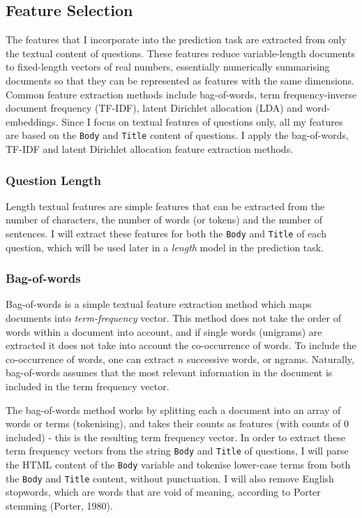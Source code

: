 \documentclass[11pt,preprint, authoryear]{article}
\begin{document}
\newpage

\subsection{Feature Selection}\label{feature-selection}

The features that I incorporate into the prediction task are extracted
from only the textual content of questions. These features reduce
variable-length documents to fixed-length vectors of real numbers,
essentially numerically summarising documents so that they can be
represented as features with the same dimensions. Common feature
extraction methods include bag-of-words, term frequency-inverse document
frequency (TF-IDF), latent Dirichlet allocation (LDA) and
word-embeddings. Since I focus on textual features of questions only,
all my features are based on the \texttt{Body} and \texttt{Title}
content of questions. I apply the bag-of-words, TF-IDF and latent
Dirichlet allocation feature extraction methods.

\subsubsection{Question Length}\label{question-length}

Length textual features are simple features that can be extracted from
the number of characters, the number of words (or tokens) and the number
of sentences. I will extract these features for both the \texttt{Body}
and \texttt{Title} of each question, which will be used later in a
\emph{length} model in the prediction task.

\subsubsection{Bag-of-words}\label{bag-of-words}

Bag-of-words is a simple textual feature extraction method which maps
documents into \emph{term-frequency} vector. This method does not take
the order of words within a document into account, and if single words
(unigrams) are extracted it does not take into account the co-occurrence
of words. To include the co-occurrence of words, one can extract \(n\)
successive words, or ngrams. Naturally, bag-of-words assumes that the
most relevant information in the document is included in the term
frequency vector.

The bag-of-words method works by splitting each a document into an array
of words or terms (tokenising), and takes their counts as features (with
counts of 0 included) - this is the resulting term frequency vector. In
order to extract these term frequency vectors from the string
\texttt{Body} and \texttt{Title} of questions, I will parse the HTML
content of the \texttt{Body} variable and tokenise lower-case terms from
both the \texttt{Body} and \texttt{Title} content, without punctuation.
I will also remove English stopwords, which are words that are void of
meaning, according to Porter stemming (Porter, 1980).
\end{document}
